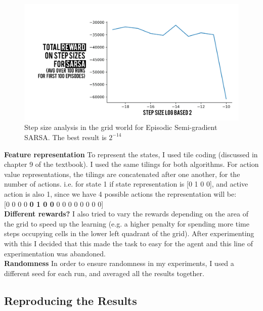 \documentclass[10pt, letterpaper, twocolumn]{article}
\begin{document}
	\begin{figure}[H]
		\centering
		\includegraphics[width=\linewidth]{figure_parameter_sarsa}
		\caption{\small Step size analysis in the grid world for Episodic Semi-gradient SARSA. The best result is $2^{-14}$}
		\label{fig:step_size_sarsa}
	\end{figure}
	
	\noindent \textbf{Feature representation} To represent the states, I used tile coding (discussed in chapter 9 of the textbook). I used the same tilings for both algorithms. For action value representations, the tilings are concatenated after one another, for the number of actions. i.e. for state 1 if state representation is [0 1 0 0], and active action is also 1, since we have 4 possible actions the representation will be: \\
	
	[0 0 0 0 \textbf{0 1 0 0} 0 0 0 0 0 0 0 0]\\
	
	
	\noindent \textbf{Different rewards?} I also tried to vary the rewards depending on the area of the grid to speed up the learning (e.g. a higher penalty for spending more time steps occupying cells in the lower left quadrant of the grid). After experimenting with this I decided that this made the task to easy for the agent and this line of experimentation was abandoned. \\
	
	\noindent \textbf{Randomness} In order to ensure randomness in my experiments, I used a different seed for each run, and averaged all the results together.
	
	\subsection{Reproducing the Results} 
	
\end{document}
